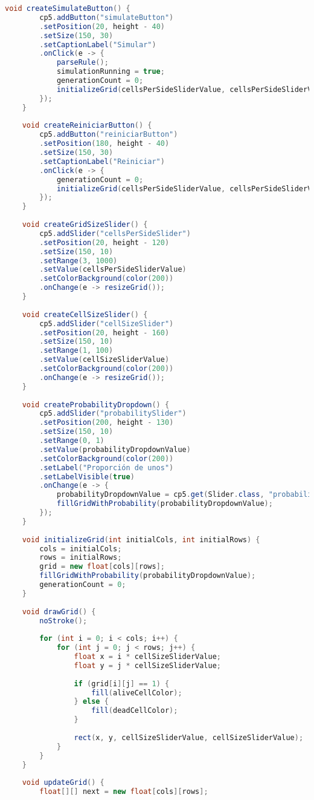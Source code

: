 \documentclass{article}
\begin{document}
\begin{lstlisting}[language=Java, basicstyle=\tiny, breaklines=true, breakatwhitespace=true]
 	void createSimulateButton() {
 		cp5.addButton("simulateButton")
 		.setPosition(20, height - 40)
 		.setSize(150, 30)
 		.setCaptionLabel("Simular")
 		.onClick(e -> {
 			parseRule();
 			simulationRunning = true;
 			generationCount = 0;
 			initializeGrid(cellsPerSideSliderValue, cellsPerSideSliderValue);
 		});
 	}
 	
 	void createReiniciarButton() {
 		cp5.addButton("reiniciarButton")
 		.setPosition(180, height - 40)
 		.setSize(150, 30)
 		.setCaptionLabel("Reiniciar")
 		.onClick(e -> {
 			generationCount = 0;
 			initializeGrid(cellsPerSideSliderValue, cellsPerSideSliderValue);
 		});
 	}
 	
 	void createGridSizeSlider() {
 		cp5.addSlider("cellsPerSideSlider")
 		.setPosition(20, height - 120)
 		.setSize(150, 10)
 		.setRange(3, 1000)
 		.setValue(cellsPerSideSliderValue)
 		.setColorBackground(color(200))
 		.onChange(e -> resizeGrid());
 	}
 	
 	void createCellSizeSlider() {
 		cp5.addSlider("cellSizeSlider")
 		.setPosition(20, height - 160)
 		.setSize(150, 10)
 		.setRange(1, 100)
 		.setValue(cellSizeSliderValue)
 		.setColorBackground(color(200))
 		.onChange(e -> resizeGrid());
 	}
 	
 	void createProbabilityDropdown() {
 		cp5.addSlider("probabilitySlider")
 		.setPosition(200, height - 130)
 		.setSize(150, 10)
 		.setRange(0, 1)
 		.setValue(probabilityDropdownValue)
 		.setColorBackground(color(200))
 		.setLabel("Proporción de unos")
 		.setLabelVisible(true)
 		.onChange(e -> {
 			probabilityDropdownValue = cp5.get(Slider.class, "probabilitySlider").getValue();
 			fillGridWithProbability(probabilityDropdownValue);
 		});
 	}
 	
 	void initializeGrid(int initialCols, int initialRows) {
 		cols = initialCols;
 		rows = initialRows;
 		grid = new float[cols][rows];
 		fillGridWithProbability(probabilityDropdownValue);
 		generationCount = 0; 
 	}
 	
 	void drawGrid() {
 		noStroke(); 
 		
 		for (int i = 0; i < cols; i++) {
 			for (int j = 0; j < rows; j++) {
 				float x = i * cellSizeSliderValue;
 				float y = j * cellSizeSliderValue;
 				
 				if (grid[i][j] == 1) {
 					fill(aliveCellColor);
 				} else {
 					fill(deadCellColor);
 				}
 				
 				rect(x, y, cellSizeSliderValue, cellSizeSliderValue);
 			}
 		}
 	}
 	
 	void updateGrid() {
 		float[][] next = new float[cols][rows];
 		

\end{lstlisting}
\end{document}
